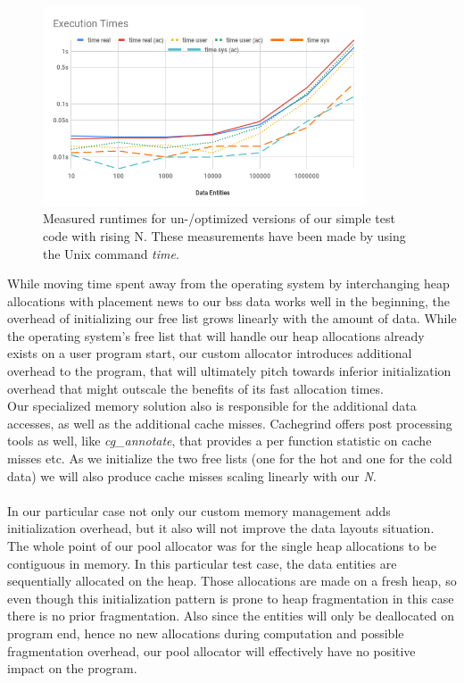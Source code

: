 \begin{figure}[!htbp]
	\centering
	\includegraphics[width=0.85\textwidth, height=0.5\textwidth]{PICs/test_file_execution_times}
	\caption{Measured runtimes for un-/optimized versions of our simple test code with rising N. These measurements have been made by using the Unix command \textit{time}.}
	\label{test_file_execution_times}
\end{figure}
While moving time spent away from the operating system by interchanging heap allocations with placement news to our bss data works well in the beginning, the overhead of initializing our free list grows linearly with the amount of data. While the operating system's free list that will handle our heap allocations already exists on a user program start, our custom allocator introduces additional overhead to the program, that will ultimately pitch towards inferior initialization overhead that might outscale the benefits of its fast allocation times.\\
Our specialized memory solution also is responsible for the additional data accesses, as well as the additional cache misses. Cachegrind offers post processing tools as well, like \textit{cg\_annotate}, that provides a per function statistic on cache misses etc. As we initialize the two free lists (one for the hot and one for the cold data) we will also produce cache misses scaling linearly with our \textit{N}.\\\\
In our particular case not only our custom memory management adds initialization overhead, but it also will not improve the data layouts situation. The whole point of our pool allocator was for the single heap allocations to be contiguous in memory. In this particular test case, the data entities are sequentially allocated on the heap. Those allocations are made on a fresh heap, so even though this initialization pattern is prone to heap fragmentation in this case there is no prior fragmentation. Also since the entities will only be deallocated on program end, hence no new allocations during computation and possible fragmentation overhead, our pool allocator will effectively have no positive impact on the program. 
